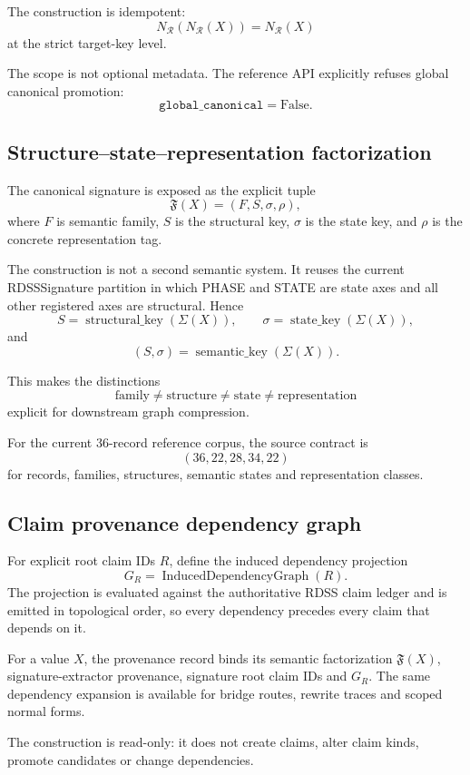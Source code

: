\documentclass[11pt]{article}
\begin{document}
The construction is idempotent:
\[
N_{\mathcal R}(N_{\mathcal R}(X))
=
N_{\mathcal R}(X)
\]
at the strict target-key level.

The scope is not optional metadata. The reference API explicitly refuses global
canonical promotion:
\[
\boxed{
\texttt{global\_canonical}=\mathrm{False}.
}
\]

\subsection{Structure--state--representation factorization}

The canonical signature is exposed as the explicit tuple
\[
\mathfrak F(X)=(F,S,\sigma,\rho),
\]
where \(F\) is semantic family, \(S\) is the structural key, \(\sigma\) is the
state key, and \(\rho\) is the concrete representation tag.

The construction is not a second semantic system. It reuses the current
RDSSSignature partition in which PHASE and STATE are state axes and all other
registered axes are structural. Hence
\[
S=\operatorname{structural\_key}(\Sigma(X)),
\qquad
\sigma=\operatorname{state\_key}(\Sigma(X)),
\]
and
\[
(S,\sigma)=\operatorname{semantic\_key}(\Sigma(X)).
\]

This makes the distinctions
\[
\text{family}\neq\text{structure}\neq\text{state}\neq\text{representation}
\]
explicit for downstream graph compression.

For the current 36-record reference corpus, the source contract is
\[
(36,22,28,34,22)
\]
for records, families, structures, semantic states and representation classes.

\subsection{Claim provenance dependency graph}

For explicit root claim IDs \(R\), define the induced dependency projection
\[
G_R=\operatorname{InducedDependencyGraph}(R).
\]
The projection is evaluated against the authoritative RDSS claim ledger and is emitted in topological order, so every dependency precedes every claim that depends on it.

For a value \(X\), the provenance record binds its semantic factorization \(\mathfrak F(X)\), signature-extractor provenance, signature root claim IDs and \(G_R\). The same dependency expansion is available for bridge routes, rewrite traces and scoped normal forms.

The construction is read-only: it does not create claims, alter claim kinds, promote candidates or change dependencies.
\end{document}
